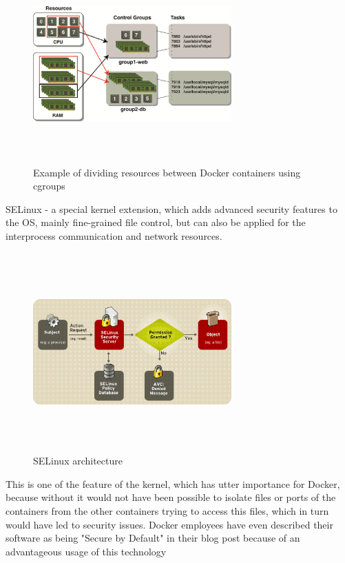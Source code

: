 \begin{figure}
\includegraphics[height=3in, width=3in]{dockerCGroups}
\caption{Example of dividing resources between Docker containers using cgroups}
\end{figure}

SELinux - a special kernel extension, which adds advanced security features to
the OS, mainly fine-grained file control, but can also be applied
for the interprocess communication and network resources. \cite{SELinuxDef}

\begin{figure}
\includegraphics[height=3in, width=3in]{SELinux}
\caption{SELinux architecture}
\end{figure}

This is one of the feature of the kernel, which has utter importance for Docker,
because without it would not have been possible to isolate files or ports
of the containers from the other containers trying to access this files,
which in turn would have led to security issues.
Docker employees have even described their software as being "Secure by Default"
in their blog post \cite{SELinuxDockBlog} because of an advantageous
usage of this technology

